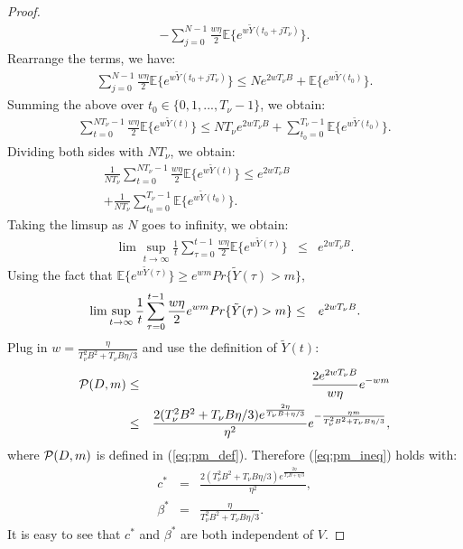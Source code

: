 \documentclass[journal]{IEEEtran}
\newcommand{\prob}{Pr}
\newcommand{\expect}[1]{\mathbb{E}\big\{#1\big\}}
\newcommand{\script}[1]{{{\cal{#1} }}}
\begin{document}
\begin{proof}
\begin{eqnarray*}
-\sum_{j=0}^{N-1}\frac{w\eta}{2}\expect{e^{w\tilde{Y}(t_0+jT_{\nu})}}. \nonumber
\end{eqnarray*}
Rearrange the terms, we have:
\begin{eqnarray*}
\sum_{j=0}^{N-1}\frac{w\eta}{2}\expect{e^{w\tilde{Y}(t_0+jT_{\nu})}}\leq Ne^{2wT_{\nu}B}+\expect{e^{w\tilde{Y}(t_0)}}.
\end{eqnarray*}
Summing the above over $t_0\in\{0,1,..., T_{\nu}-1\}$, we obtain:
\begin{eqnarray*}
\sum_{t=0}^{NT_{\nu}-1}\frac{w\eta}{2}\expect{e^{w\tilde{Y}(t)}}\leq NT_{\nu}e^{2wT_{\nu}B}+\sum_{t_0=0}^{T_{\nu}-1}\expect{e^{w\tilde{Y}(t_0)}}.
\end{eqnarray*}
Dividing both sides with $NT_{\nu}$, we obtain:
\begin{eqnarray}
\frac{1}{NT_{\nu}}\sum_{t=0}^{NT_{\nu}-1}\frac{w\eta}{2}\expect{e^{w\tilde{Y}(t)}} \leq e^{2wT_{\nu}B}\label{eq:initialnotmatter1}\qquad\qquad\qquad\\
+\frac{1}{NT_{\nu}}\sum_{t_0=0}^{T_{\nu}-1}\expect{e^{w\tilde{Y}(t_0)}}.\nonumber
\end{eqnarray}
Taking the limsup as $N$ goes to infinity, we obtain:
\begin{eqnarray}
\lim\sup_{t\rightarrow\infty}\frac{1}{t}\sum_{\tau=0}^{t-1}\frac{w\eta}{2}\expect{e^{w\tilde{Y}(\tau)}} &\leq&e^{2wT_{\nu}B}.\label{eq:initialnotmatter2}
\end{eqnarray}
Using the fact that $\expect{e^{w\tilde{Y}(\tau)}}\geq e^{wm}\prob\{\tilde{Y}(\tau)>m\}$, 
\begin{eqnarray}
\hspace{-.2in}\lim\sup_{t\rightarrow\infty}\frac{1}{t}\sum_{\tau=0}^{t-1}\frac{w\eta}{2}e^{wm}\prob\{\tilde{Y}(\tau)>m\} &\leq&e^{2wT_{\nu}B}.\label{eq:prob_tildeY}
\end{eqnarray}
Plug in $w=\frac{\eta}{T_{\nu}^2B^2+T_{\nu}B\eta/3}$ and use the definition of $\tilde{Y}(t)$:
\begin{eqnarray}
\script{P}(D, m) &\leq&\frac{2e^{2wT_{\nu}B}}{w\eta}e^{-wm}\label{eq:prob_tildeY_final_alter}\\
&\leq &\frac{2(T_{\nu}^2B^2+T_{\nu}B\eta/3)e^{\frac{2\eta}{T_{\nu}B+\eta/3}}}{\eta^2} e^{-\frac{\eta m}{T_{\nu}^2B^2+T_{\nu}B\eta/3}}, \nonumber
\end{eqnarray}
where $\script{P}(D, m)$ is defined in (\ref{eq:pm_def}). Therefore (\ref{eq:pm_ineq}) holds with: 
\begin{eqnarray}
c^*&=&\frac{2(T_{\nu}^2B^2+T_{\nu}B\eta/3)e^{\frac{2\eta}{T_{\nu}B+\eta/3}}}{\eta^2},\nonumber\\
\beta^*&=&\frac{\eta}{T_{\nu}^2B^2+T_{\nu}B\eta/3}.\label{eq:pm_ineq_const}
\end{eqnarray}
It is easy to see that $c^*$ and $\beta^*$ are both independent of $V$. 
\end{proof}
\end{document}
